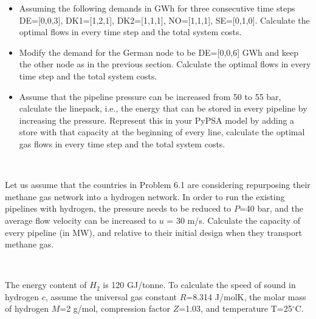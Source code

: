 \documentclass[10pt]{article}
\newenvironment{problem}[2][Problem]{\begin{trivlist}
\item[\hskip \labelsep {\bfseries #1}\hskip \labelsep {\bfseries #2.}]}{\end{trivlist}}
\begin{document}
\begin{problem}{6.1}
\begin{itemize}
\item[d)] Assuming the following demands in GWh for three consecutive time steps DE=[0,0,3], DK1=[1,2,1], DK2=[1,1,1], NO=[1,1,1], SE=[0,1,0]. Calculate the optimal flows in every time step and the total system costs. 

\item[e)] Modify the demand for the German node to be DE=[0,0,6] GWh and keep the other node as in the previous section. Calculate the optimal flows in every time step and the total system costs.

\item[f)] Assume that the pipeline pressure can be increased from 50 to 55 bar, calculate the linepack, i.e., the energy that can be stored in every pipeline by increasing the pressure. Represent this in your PyPSA model by adding a store with that capacity at the beginning of every line, calculate the optimal gas flows in every time step and the total system costs.

\end{itemize}


\end{problem}

\

\begin{problem}{6.2}
Let us assume that the countries in Problem 6.1 are considering repurposing their methane gas network into a hydrogen network. In order to run the existing pipelines with hydrogen, the pressure needs to be reduced to $P$=40 bar, and the average flow velocity can be increased to $u$ = 30 m/s. Calculate the capacity of every pipeline (in MW), and relative to their initial design when they transport methane gas. 

\

The energy content of $H_2$ is 120 GJ/tonne. To calculate the speed of sound in hydrogen $c$, assume the universal gas constant $R$=8.314 J/molK, the molar mass of hydrogen $M$=2 g/mol, compression factor $Z$=1.03, and temperature T=25$^{\circ}$C.


\end{problem}

\
\end{document}

